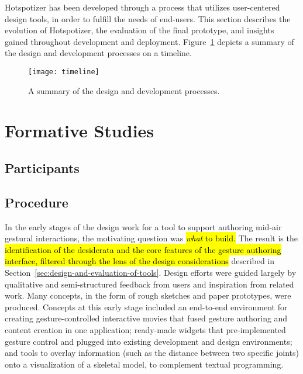 Hotspotizer has been developed through a process that utilizes user-centered design tools, in order to fulfill the needs of end-users. This section describes the evolution of Hotspotizer, the evaluation of the final prototype, and insights gained throughout development and deployment. Figure~\ref{fig:timeline} depicts a summary of the design and development processes on a timeline.

\begin{figure}[ht]
\centering
\texttt{[image: timeline]}
\caption{A summary of the design and development processes.}
\label{fig:timeline}
\end{figure}

\section{Formative Studies}
\label{sec:formative-studies}

\subsection{Participants}

\subsection{Procedure}

In the early stages of the design work for a tool to support authoring mid-air gestural interactions, the motivating question was \hl{\emph{what} to build.} The result is the \hl{identification of the desiderata and the core features of the gesture authoring interface, filtered through the lens of the design considerations} described in Section~\ref{sec:design-and-evaluation-of-tools}. Design efforts were guided largely by qualitative and semi-structured feedback from users and inspiration from related work. Many concepts, in the form of rough sketches and paper prototypes, were produced. Concepts at this early stage included an end-to-end environment for creating gesture-controlled interactive movies that fused gesture authoring and content creation in one application; ready-made widgets that pre-implemented gesture control and plugged into existing development and design environments; and tools to overlay information (such as the distance between two specific joints) onto a visualization of a skeletal model, to complement textual programming.

